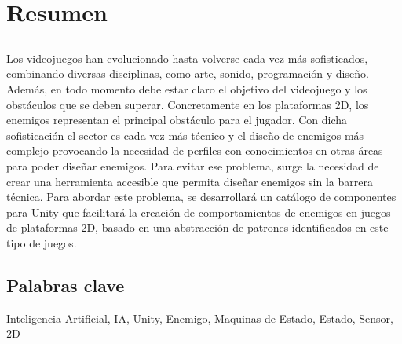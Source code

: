 \chapter*{Resumen}

\section*{\tituloPortadaVal}
Los videojuegos han evolucionado hasta volverse cada vez más sofisticados, combinando diversas disciplinas, como arte, sonido, programación y diseño. Además, en todo momento debe estar claro el objetivo del videojuego y los obstáculos que se deben superar. Concretamente en los plataformas 2D, los enemigos representan el principal obstáculo para el jugador. Con dicha sofisticación el sector es cada vez más técnico y el diseño de enemigos más complejo provocando la necesidad de perfiles con conocimientos en otras áreas para poder diseñar enemigos. Para evitar ese problema, surge la necesidad de crear una herramienta accesible que permita diseñar enemigos sin la barrera técnica. Para abordar este problema, se desarrollará un catálogo de componentes para Unity que facilitará la creación de comportamientos de enemigos en juegos de plataformas 2D, basado en una abstracción de patrones identificados en este tipo de juegos.
\section*{Palabras clave}
   
\noindent Inteligencia Artificial, IA, Unity, Enemigo, Maquinas de Estado, Estado, Sensor, 2D

   


